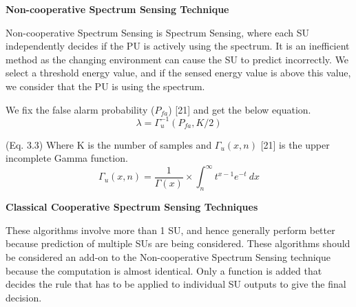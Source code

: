 \textbf{Non-cooperative Spectrum Sensing Technique}

Non-cooperative Spectrum Sensing is Spectrum Sensing, where each SU independently decides if the PU is actively using the spectrum. It is an inefficient method as the changing environment can cause the SU to predict incorrectly. We select a threshold energy value, and if the sensed energy value is above this value, we consider that the PU is using the spectrum.

We fix the false alarm probability ($P_{fa}$) [21] and get the below equation.
\begin{equation}
\lambda=\Gamma_{u}^{-1} (P_{fa},K/2  )
\end{equation}

(Eq. 3.3) Where K is the number of samples and $\Gamma_u (x,n)$ [21] is the upper incomplete Gamma function.
\begin{equation}
\Gamma_{u} (x,n)= \frac{1} {\Gamma(x)} \times \int_n^\infty t^{x-1} e^{-t} \ dx
\end{equation}





\textbf{Classical Cooperative Spectrum Sensing Techniques}

These algorithms involve more than 1 SU, and hence generally perform better because prediction of multiple SUs are being considered. These algorithms should be considered an add-on to the Non-cooperative Spectrum Sensing technique because the computation is almost identical. Only a function is added that decides the rule that has to be applied to individual SU outputs to give the final decision. 

